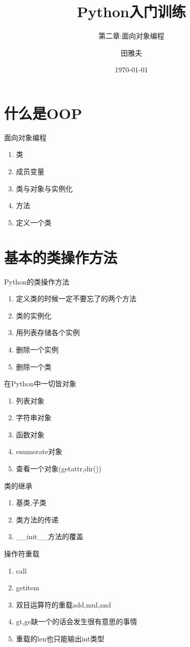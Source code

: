 \documentclass{beamer}
\title{Python入门训练}
\subtitle{第二章:面向对象编程}
\author{田雅夫}
\institute{控制模型创新实验室}
\date{\today}
\begin{document}
  


\frame{\titlepage} 
 
\section{什么是OOP}
\begin{frame}{面向对象编程}
\begin{enumerate}
\item 类
\item 成员变量
\item 类与对象与实例化
\item 方法
\item 定义一个类
\end{enumerate}
\end{frame}  

\section{基本的类操作方法}
\begin{frame}{Python的类操作方法}
\begin{enumerate}
\item 定义类的时候一定不要忘了的两个方法
\item 类的实例化
\item 用列表存储各个实例
\item 删除一个实例
\item 删除一个类
\end{enumerate}
\end{frame}

\begin{frame}{在Python中一切皆对象}
\begin{enumerate}
\item 列表对象
\item 字符串对象
\item 函数对象
\item enumerate对象
\item 查看一个对象(getattr,dir())

\end{enumerate}

\end{frame}

\begin{frame}{类的继承}
\begin{enumerate}
\item 基类,子类
\item 类方法的传递
\item \_\_init\_\_方法的覆盖 
\end{enumerate}

\end{frame}

\begin{frame}{操作符重载}
\begin{enumerate}
\item call
\item getitem
\item 双目运算符的重载add,mul,and
\item gt,ge缺一个的话会发生很有意思的事情
\item 重载的len也只能输出int类型

\end{enumerate}

\end{frame}
\end{document}
